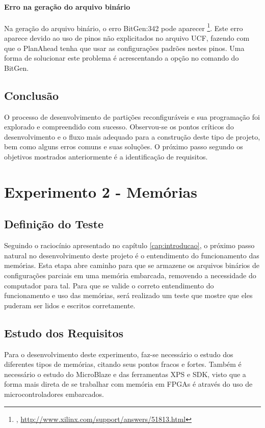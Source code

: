 \documentclass[11pt,a4paper,oneside]{book}
\begin{document}
\subsubsection{Erro na geração do arquivo binário}
Na geração do arquivo binário, o erro BitGen:342 pode aparecer \footnote{, \url{http://www.xilinx.com/support/answers/51813.html}}.
Este erro aparece devido ao uso de pinos não explicitados no arquivo UCF, fazendo com que o PlanAhead tenha que usar as configurações padrões nestes pinos.
Uma forma de solucionar este problema é acrescentando a opção  no comando do BitGen. 

\section{Conclusão}
O processo de desenvolvimento de partições reconfiguráveis e sua programação foi explorado e compreendido com sucesso.
Observou-se os pontos críticos do desenvolvimento e o fluxo mais adequado para a construção deste tipo de projeto, bem como alguns erros comuns e suas soluções.
O próximo passo segundo os objetivos mostrados anteriormente é a identificação de requisitos.


\chapter{Experimento 2 - Memórias}
\section{Definição do Teste}
Seguindo o raciocínio apresentado no capítulo \ref{cap:introducao}, o próximo passo natural no desenvolvimento deste projeto é o entendimento do funcionamento das memórias.
Esta etapa abre caminho para que se armazene os arquivos binários de configurações parciais em uma memória embarcada, removendo a necessidade do computador para tal.
Para que se valide o correto entendimento do funcionamento e uso das memórias, será realizado um teste que mostre que eles puderam ser lidos e escritos corretamente.

\section{Estudo dos Requisitos}
Para o desenvolvimento deste experimento, faz-se necessário o estudo dos diferentes tipos de memórias, citando seus pontos fracos e fortes.
Também é necessário o estudo do MicroBlaze e das ferramentas XPS e SDK, visto que a forma mais direta de se trabalhar com memória em FPGAs é através do uso de microcontroladores embarcados.
\end{document}
